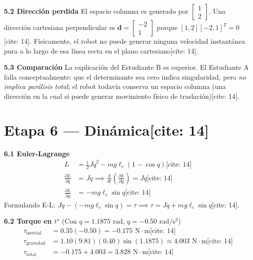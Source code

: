 \documentclass[11pt, a4paper]{article}
\begin{document}
\textbf{5.2 Dirección perdida}
El espacio columna es generado por $\begin{bmatrix} 1 \\ 2 \end{bmatrix}$. Una dirección cartesiana perpendicular es $\boxed{ \mathbf{d} = \begin{bmatrix} -2 \\ 1 \end{bmatrix} }$ porque $[1, 2][-2, 1]^T = 0$[cite: 14]. Físicamente, el robot no puede generar ninguna velocidad instantánea pura a lo largo de esa línea recta en el plano cartesiano[cite: 14].

\textbf{5.3 Comparación}
La explicación del Estudiante B es superior. El Estudiante A falla conceptualmente: que el determinante sea cero indica singularidad, pero \textit{no implica parálisis total}; el robot todavía conserva un espacio columna (una dirección en la cual sí puede generar movimiento físico de traslación)[cite: 14].

\section*{Etapa 6 — Dinámica[cite: 14]}

\textbf{6.1 Euler-Lagrange}
\begin{align*}
    L &= \frac{1}{2}J\dot{q}^2 - mg\ell_c(1 - \cos q) \text{[cite: 14]} \\
    \frac{\partial L}{\partial \dot{q}} &= J\dot{q} \implies \frac{d}{dt}\left(\frac{\partial L}{\partial \dot{q}}\right) = J\ddot{q} \text{[cite: 14]}\\
    \frac{\partial L}{\partial q} &= -mg\ell_c\sin q \text{[cite: 14]}
\end{align*}
Formulando E-L: $J\ddot{q} - (-mg\ell_c\sin q) = \tau \implies \boxed{ \tau = J\ddot{q} + mg\ell_c\sin q }$[cite: 14].

\textbf{6.2 Torque en $t^\star$} (Con $q=1.1875$ rad, $\ddot{q}=-0.50$ rad/s$^2$)
\begin{align*}
    \tau_{\text{inercial}} &= 0.35(-0.50) = \boxed{ -0.175 \text{ N}\cdot\text{m} } \text{[cite: 14]} \\
    \tau_{\text{gravedad}} &= 1.10(9.81)(0.40)\sin(1.1875) \approx \boxed{ 4.003 \text{ N}\cdot\text{m} } \text{[cite: 14]} \\
    \tau_{\text{total}} &= -0.175 + 4.003 = \boxed{ 3.828 \text{ N}\cdot\text{m} } \text{[cite: 14]}
\end{align*}
\end{document}
